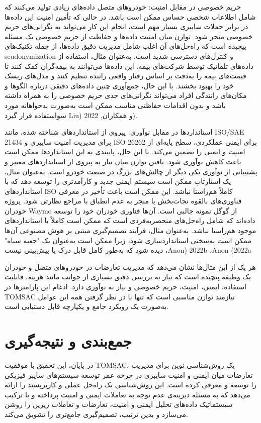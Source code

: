 \documentclass[a4paper,10pt]{article}
\begin{document}
        حریم خصوصی در مقابل امنیت: خودروهای متصل داده‌های زیادی تولید می‌کنند که شامل اطلاعات شخصی حساس ممکن است باشد. در حالی که تأمین امنیت این داده‌ها در برابر حملات سایبری بسیار مهم است، انجام این کار می‌تواند به نگرانی‌های حریم خصوصی منجر شود. توازن میان امنیت داده‌ها و حفاظت از حریم خصوصی یک مسئله پیچیده است که راه‌حل‌های آن اغلب شامل مدیریت دقیق داده‌ها، از جمله تکنیک‌های seudonymization و کنترل‌های دسترسی شدید است. به‌عنوان مثال، استفاده از داده‌های تلماتیک توسط شرکت‌های بیمه. این داده‌ها می‌توانند به بیمه‌گران کمک کنند تا قیمت‌های بیمه را به‌دقت بر اساس رفتار واقعی راننده تنظیم کنند و مدل‌های ریسک خود را بهبود بخشند. با این حال، جمع‌آوری چنین داده‌های دقیقی درباره الگوها و مکان‌های رانندگی افراد می‌تواند نگرانی‌های جدی حریم خصوصی را به همراه داشته باشد و بدون اقدامات حفاظتی مناسب ممکن است به‌صورت بدخواهانه مورد سواستفاده قرار گیرد Liu) و همکاران, 2022).

        استانداردها در مقابل نوآوری: پیروی از استانداردهای شناخته شده، مانند ISO/SAE 21434 برای مدیریت امنیت سایبری و ISO 26262 برای ایمنی عملکردی، سطح پایه‌ای از امنیت و ایمنی را تضمین می‌کند. با این حال، پایبندی به این استانداردها ممکن است باعث کاهش نوآوری شود. یافتن توازن میان نیاز به پیروی از استانداردهای معتبر و پشتیبانی از نوآوری یکی دیگر از چالش‌های بزرگ در صنعت خودرو است. به‌عنوان مثال، یک استارتاپ ممکن است سیستم ایمنی جدید و کارآمدتری را توسعه دهد که با استانداردهای ISO کاملاً هم‌راستا نباشد. این ممکن است باعث تأخیر در معرفی فناوری‌های بالقوه نجات‌بخش یا منجر به عدم انطباق با مراجع نظارتی شود. پروژه خودران Waymo از گوگل نمونه جالبی است. آن‌ها فناوری خودران خود را توسعه داده‌اند که شامل راه‌حل‌های منحصربه‌فردی است که ممکن است کاملاً با استانداردهای موجود هم‌راستا نباشد. به‌عنوان مثال، فرآیند تصمیم‌گیری مبتنی بر هوش مصنوعی آن‌ها ممکن است به‌سختی استانداردسازی شود، زیرا ممکن است به‌عنوان یک "جعبه سیاه" دیده شود که به‌طور کامل قابل درک یا پیش‌بینی نیست ،Anon) 2022b ،Anon (2022a

        هر یک از این مثال‌ها نشان می‌دهد که مدیریت تعارضات در خودروهای متصل و خودران یک وظیفه پیچیده است که نیاز به بررسی دقیق بسیاری از جوانب مانند هزینه، قابلیت استفاده، ایمنی، امنیت، حریم خصوصی و نیاز به نوآوری دارد. ادغام این پارامترها در TOMSAC نیازمند توازن مناسبی است که تنها با در نظر گرفتن همه این عوامل به‌صورت یک رویکرد جامع و یکپارچه قابل دستیابی است.


    \section{جمع‌بندی و نتیجه‌گیری}

        در پایان، این تحقیق با موفقیت TOMSAC، یک روش‌شناسی نوین برای مدیریت تعارضات میان ایمنی و امنیت سایبری در چرخه عمر توسعه سیستم‌های سایبر-فیزیکی را توسعه و معرفی کرده است. این روش‌شناسی یک راه‌حل عملی و کاربرپسند را ارائه می‌دهد که به مسئله دیرینه‌ی عدم توجه به تعاملات ایمنی و امنیت پرداخته و با ترکیب سیستماتیک داده‌های تحلیل ایمنی و امنیت، تعارضات و تعاملات زیرین را روشن می‌سازد و بدین ترتیب، تصمیم‌گیری جامع‌تری را تشویق می‌کند.
\end{document}
